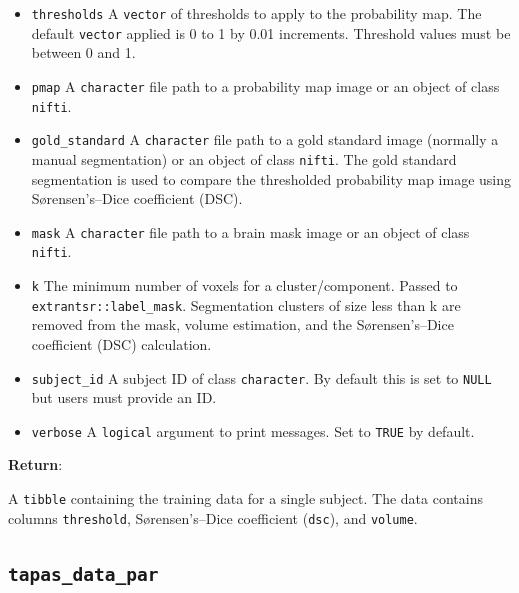 \documentclass[]{article}
\providecommand{\tightlist}{%
  \setlength{\itemsep}{0pt}\setlength{\parskip}{0pt}}
\begin{document}
\begin{itemize}
\tightlist
\item
  \texttt{thresholds} A \texttt{vector} of thresholds to apply to the
  probability map. The default \texttt{vector} applied is 0 to 1 by 0.01
  increments. Threshold values must be between 0 and 1.
\item
  \texttt{pmap} A \texttt{character} file path to a probability map
  image or an object of class \texttt{nifti}.
\item
  \texttt{gold\_standard} A \texttt{character} file path to a gold
  standard image (normally a manual segmentation) or an object of class
  \texttt{nifti}. The gold standard segmentation is used to compare the
  thresholded probability map image using Sørensen's--Dice coefficient
  (DSC).\\
\item
  \texttt{mask} A \texttt{character} file path to a brain mask image or
  an object of class \texttt{nifti}.\\
\item
  \texttt{k} The minimum number of voxels for a cluster/component.
  Passed to \texttt{extrantsr::label\_mask}. Segmentation clusters of
  size less than k are removed from the mask, volume estimation, and the
  Sørensen's--Dice coefficient (DSC) calculation.
\item
  \texttt{subject\_id} A subject ID of class \texttt{character}. By
  default this is set to \texttt{NULL} but users must provide an ID.\\
\item
  \texttt{verbose} A \texttt{logical} argument to print messages. Set to
  \texttt{TRUE} by default.
\end{itemize}

\textbf{Return}:

A \texttt{tibble} containing the training data for a single subject. The
data contains columns \texttt{threshold}, Sørensen's--Dice coefficient
(\texttt{dsc}), and \texttt{volume}.

\hypertarget{tapas_data_par}{%
\subsection{\texorpdfstring{\texttt{tapas\_data\_par}}{tapas\_data\_par}}\label{tapas_data_par}}
\end{document}
